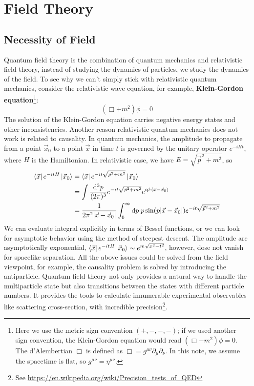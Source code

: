 \documentclass[12pt]{article}
\numberwithin{equation}{section}
\theoremstyle{1style}
\newcommand{\tbf}[1]{\textbf{#1}}
\newcommand{\p}{\partial}
\newcommand{\id}{\mathrm{d}}
\begin{document}
\newpage





\section{Field Theory}
\subsection{Necessity of Field}
Quantum field theory is the combination of quantum mechanics and relativistic field theory,
instead of studying the dynamics of particles, we study the dynamics of the field.
To see why we can't simply stick with relativistic quantum mechanics, consider the relativistic
wave equation, for example, \tbf{Klein-Gordon equation}\footnote{
  Here we use the metric sign convention \((+,-,-,-)\); if we used another sign convention, the Klein-Gordon equation
  would read \((\Box - m^2) \phi = 0\). The d'Alembertian \(\Box\) is defined as \(\Box = g^{\mu\nu}\p_{\mu}\p_{\nu}\).
  In this note, we assume the spacetime is flat, so \(g^{\mu\nu}=\eta^{\mu\nu}\).
}:
\begin{equation}\label{kg}
  (\Box +m^2)\phi=0
\end{equation}
The solution of the Klein-Gordon equation carries negative energy states and other inconsistencies.
Another reason relativistic quantum mechanics does not work is related to causality.
In quantum mechanics, the amplitude to propagate from a point \(\vec{x}_0\) to a point \(\vec{x}\) in time \(t\)
is governed by the unitary operator \(e^{-iHt}\), where \(H\) is the Hamiltonian.
In relativistic case, we have \(E=\sqrt{\vec{p}^2+m^2}\), so
\begin{align}
  \bra{\vec{x}}e^{-itH}\ket{\vec{x}_0} & =\bra{\vec{x}}e^{-it\sqrt{p^2+m^2}}\ket{\vec{x}_0}                                                                 \\
                                       & =\int\frac{\id^3p}{(2\pi)^3}e^{-it\sqrt{\vec{p}^2+m^2}}e^{i\vec{p}\cdot(\vec{x}-\vec{x}_0)}                        \\
                                       & =\frac{1}{2\pi^2|\vec{x}-\vec{x}_0|}\int_{0}^{\infty}\id p\;p\sin(p|\vec{x}-\vec{x}_0|)e^{-it\sqrt{\vec{p}^2+m^2}}
\end{align}
We can evaluate integral explicitly in terms of Bessel functions, or we can look for asymptotic behavior using the method of steepest descent.
The amplitude are asymptotically exponential, \(\bra{\vec{x}}e^{-itH}\ket{\vec{x}_0}\sim e^{m\sqrt{x^2-t^2}}\), however, dose not vanish for spacelike separation.
All the above issues could be solved from the field viewpoint, for example, the causality problem is solved by introducing the antiparticle.
Quantum field theory not only provides a natural way to handle the multiparticle state but also transitions between the states
with different particle numbers. It provides the tools to calculate innumerable experimental observables like scattering cross-section,
with incredible precision\footnote{See \url{https://en.wikipedia.org/wiki/Precision_tests_of_QED}}.
\end{document}
